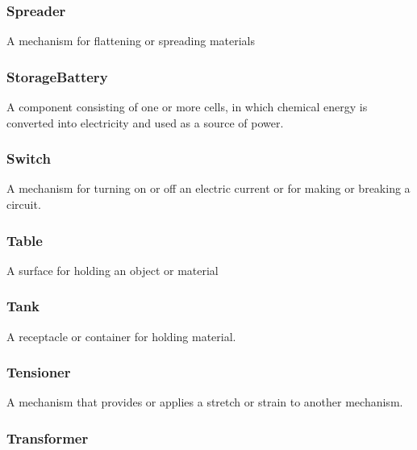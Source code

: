 \subsubsection{Spreader}
  \label{sec:Spreader}


A mechanism for flattening or spreading materials

\FloatBarrier

\subsubsection{StorageBattery}
  \label{sec:StorageBattery}


A component consisting of one or more cells, in which chemical energy is converted into electricity and used as a source of power. 

\FloatBarrier

\subsubsection{Switch}
  \label{sec:Switch}


A mechanism for turning on or off an electric current or for making or breaking a circuit.

\FloatBarrier

\subsubsection{Table}
  \label{sec:Table}


A surface for holding an object or material

\FloatBarrier

\subsubsection{Tank}
  \label{sec:Tank}


A receptacle or container for holding material.

\FloatBarrier

\subsubsection{Tensioner}
  \label{sec:Tensioner}


A mechanism that provides or applies a stretch or strain to another mechanism.

\FloatBarrier

\subsubsection{Transformer}
  \label{sec:Transformer}


